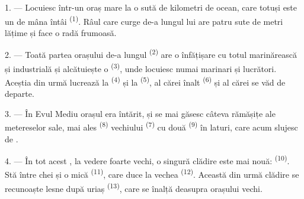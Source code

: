 %
%

\VUsaut{2.0mm}
\VUsaut{3.0mm}
\VUfilet{16mm}
\VUsaut{5.6mm}
\VUsaut{1.4mm}
\VUsaut{2.2mm}

\VUsaut{3.0mm}

1. --- Locuiesc într-un oraș mare la o sută de kilometri de ocean, care totuși este
un  de mâna întâi \textsuperscript{(1)}. Râul care curge de-a lungul
lui are patru sute de metri lățime și face o radă frumoasă.

2. --- Toată partea orașului de-a lungul 
\textsuperscript{(2)} are o înfățișare cu totul marinărească și industrială și
alcătuiește o  \textsuperscript{(3)}, unde locuiesc numai marinari
și lucrători. Aceștia din urmă lucrează la  \textsuperscript{(4)} și
la  \textsuperscript{(5)}, al cărei  înalt
\textsuperscript{(6)} și al cărei  se văd de departe.

3. --- În Evul Mediu orașul era întărit, și se mai găsesc câteva rămășițe ale
metereselor sale, mai ales  \textsuperscript{(8)} vechiului
 \textsuperscript{(7)} cu două 
\textsuperscript{(9)} în laturi, care acum slujesc de .

4. --- În tot acest , la vedere foarte vechi, o singură clădire este
mai nouă:  \textsuperscript{(10)}. Stă între chei și o 
mică \textsuperscript{(11)}, care duce la vechea 
\textsuperscript{(12)}. Această din urmă clădire se recunoaște lesne după
 uriaș \textsuperscript{(13)}, care se înalță deasupra
orașului vechi.

